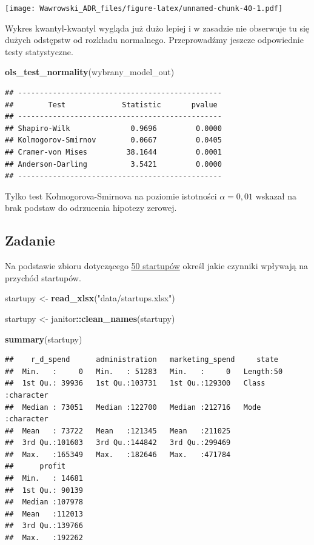 \documentclass[]{book}
\newenvironment{Shaded}{\begin{snugshade}}{\end{snugshade}}
\newcommand{\KeywordTok}[1]{\textcolor[rgb]{0.13,0.29,0.53}{\textbf{#1}}}
\newcommand{\NormalTok}[1]{#1}
\newcommand{\OperatorTok}[1]{\textcolor[rgb]{0.81,0.36,0.00}{\textbf{#1}}}
\newcommand{\StringTok}[1]{\textcolor[rgb]{0.31,0.60,0.02}{#1}}
\begin{document}
\texttt{[image: Wawrowski\_ADR\_files/figure-latex/unnamed-chunk-40-1.pdf]}

Wykres kwantyl-kwantyl wygląda już dużo lepiej i w zasadzie nie obserwuje tu się dużych odstępstw od rozkładu normalnego. Przeprowadźmy jeszcze odpowiednie testy statystyczne.

\begin{Shaded}
\begin{Highlighting}[]
\KeywordTok{ols_test_normality}\NormalTok{(wybrany_model_out)}
\end{Highlighting}
\end{Shaded}

\begin{verbatim}
## -----------------------------------------------
##        Test             Statistic       pvalue  
## -----------------------------------------------
## Shapiro-Wilk              0.9696         0.0000 
## Kolmogorov-Smirnov        0.0667         0.0405 
## Cramer-von Mises         38.1644         0.0001 
## Anderson-Darling          3.5421         0.0000 
## -----------------------------------------------
\end{verbatim}

Tylko test Kołmogorova-Smirnova na poziomie istotności \(\alpha=0,01\) wskazał na brak podstaw do odrzucenia hipotezy zerowej.

\hypertarget{zadanie-1}{%
\subsection{Zadanie}\label{zadanie-1}}

Na podstawie zbioru dotyczącego \href{data/startups.xlsx}{50 startupów} określ jakie czynniki wpływają na przychód startupów.

\begin{Shaded}
\begin{Highlighting}[]
\NormalTok{startupy <-}\StringTok{ }\KeywordTok{read_xlsx}\NormalTok{(}\StringTok{"data/startups.xlsx"}\NormalTok{)}

\NormalTok{startupy <-}\StringTok{ }\NormalTok{janitor}\OperatorTok{::}\KeywordTok{clean_names}\NormalTok{(startupy)}

\KeywordTok{summary}\NormalTok{(startupy)}
\end{Highlighting}
\end{Shaded}

\begin{verbatim}
##    r_d_spend      administration   marketing_spend     state          
##  Min.   :     0   Min.   : 51283   Min.   :     0   Length:50         
##  1st Qu.: 39936   1st Qu.:103731   1st Qu.:129300   Class :character  
##  Median : 73051   Median :122700   Median :212716   Mode  :character  
##  Mean   : 73722   Mean   :121345   Mean   :211025                     
##  3rd Qu.:101603   3rd Qu.:144842   3rd Qu.:299469                     
##  Max.   :165349   Max.   :182646   Max.   :471784                     
##      profit      
##  Min.   : 14681  
##  1st Qu.: 90139  
##  Median :107978  
##  Mean   :112013  
##  3rd Qu.:139766  
##  Max.   :192262
\end{verbatim}
\end{document}
